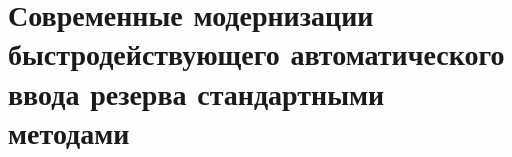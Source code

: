 \chapter{Современные модернизации быстродействующего автоматического ввода резерва стандартными методами}
\label{ch:bavr_modernization}















